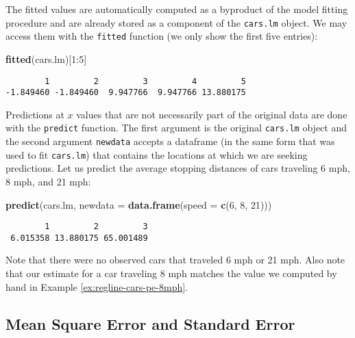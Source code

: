 \documentclass[]{book}
\newenvironment{Shaded}{\begin{snugshade}}{\end{snugshade}}
\newcommand{\KeywordTok}[1]{\textcolor[rgb]{0.13,0.29,0.53}{\textbf{{#1}}}}
\newcommand{\DataTypeTok}[1]{\textcolor[rgb]{0.13,0.29,0.53}{{#1}}}
\newcommand{\DecValTok}[1]{\textcolor[rgb]{0.00,0.00,0.81}{{#1}}}
\newcommand{\NormalTok}[1]{{#1}}
\numberwithin{equation}{chapter}
\numberwithin{figure}{chapter}
\theoremstyle{plain}
\theoremstyle{definition}
\theoremstyle{remark}
\theoremstyle{definition}
\theoremstyle{definition}
\theoremstyle{remark}
\begin{document}
The fitted values are automatically computed as a byproduct of the model
fitting procedure and are already stored as a component of the
\texttt{cars.lm} object. We may access them with the \texttt{fitted}
function (we only show the first five entries):

\begin{Shaded}
\begin{Highlighting}[]
\KeywordTok{fitted}\NormalTok{(cars.lm)[}\DecValTok{1}\NormalTok{:}\DecValTok{5}\NormalTok{]}
\end{Highlighting}
\end{Shaded}

\begin{verbatim}
        1         2         3         4         5 
-1.849460 -1.849460  9.947766  9.947766 13.880175 
\end{verbatim}

Predictions at \(x\) values that are not necessarily part of the
original data are done with the \texttt{predict} function. The first
argument is the original \texttt{cars.lm} object and the second argument
\texttt{newdata} accepts a dataframe (in the same form that was used to
fit \texttt{cars.lm}) that contains the locations at which we are
seeking predictions. Let us predict the average stopping distances of
cars traveling 6 mph, 8 mph, and 21 mph:

\begin{Shaded}
\begin{Highlighting}[]
\KeywordTok{predict}\NormalTok{(cars.lm, }\DataTypeTok{newdata =} \KeywordTok{data.frame}\NormalTok{(}\DataTypeTok{speed =} \KeywordTok{c}\NormalTok{(}\DecValTok{6}\NormalTok{, }\DecValTok{8}\NormalTok{, }\DecValTok{21}\NormalTok{)))}
\end{Highlighting}
\end{Shaded}

\begin{verbatim}
        1         2         3 
 6.015358 13.880175 65.001489 
\end{verbatim}

Note that there were no observed cars that traveled 6 mph or 21 mph.
Also note that our estimate for a car traveling 8 mph matches the value
we computed by hand in Example \ref{ex:regline-cars-pe-8mph}.

\subsection{Mean Square Error and Standard
Error}\label{mean-square-error-and-standard-error}
\end{document}
